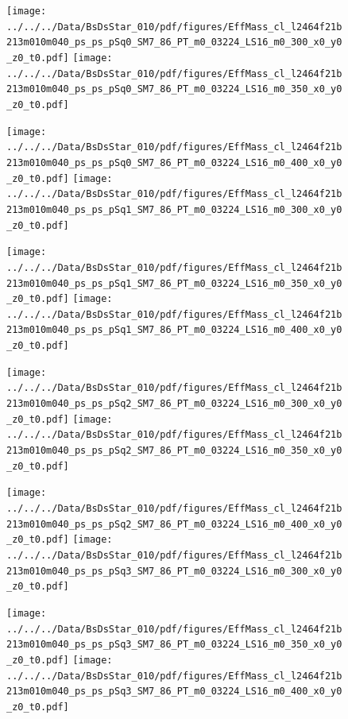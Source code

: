 \documentclass[a4paper,10pt]{article}
\begin{document}
\begin{figure}[p]
 \texttt{[image: ../../../Data/BsDsStar\_010/pdf/figures/EffMass\_cl\_l2464f21b213m010m040\_ps\_ps\_pSq0\_SM7\_86\_PT\_m0\_03224\_LS16\_m0\_300\_x0\_y0\_z0\_t0.pdf]} 
 \texttt{[image: ../../../Data/BsDsStar\_010/pdf/figures/EffMass\_cl\_l2464f21b213m010m040\_ps\_ps\_pSq0\_SM7\_86\_PT\_m0\_03224\_LS16\_m0\_350\_x0\_y0\_z0\_t0.pdf]} 
 \end{figure}
\begin{figure}[p]
 \texttt{[image: ../../../Data/BsDsStar\_010/pdf/figures/EffMass\_cl\_l2464f21b213m010m040\_ps\_ps\_pSq0\_SM7\_86\_PT\_m0\_03224\_LS16\_m0\_400\_x0\_y0\_z0\_t0.pdf]} 
 \texttt{[image: ../../../Data/BsDsStar\_010/pdf/figures/EffMass\_cl\_l2464f21b213m010m040\_ps\_ps\_pSq1\_SM7\_86\_PT\_m0\_03224\_LS16\_m0\_300\_x0\_y0\_z0\_t0.pdf]} 
 \end{figure}
\begin{figure}[p]
 \texttt{[image: ../../../Data/BsDsStar\_010/pdf/figures/EffMass\_cl\_l2464f21b213m010m040\_ps\_ps\_pSq1\_SM7\_86\_PT\_m0\_03224\_LS16\_m0\_350\_x0\_y0\_z0\_t0.pdf]} 
 \texttt{[image: ../../../Data/BsDsStar\_010/pdf/figures/EffMass\_cl\_l2464f21b213m010m040\_ps\_ps\_pSq1\_SM7\_86\_PT\_m0\_03224\_LS16\_m0\_400\_x0\_y0\_z0\_t0.pdf]} 
 \end{figure}
\clearpage
\begin{figure}[p]
 \texttt{[image: ../../../Data/BsDsStar\_010/pdf/figures/EffMass\_cl\_l2464f21b213m010m040\_ps\_ps\_pSq2\_SM7\_86\_PT\_m0\_03224\_LS16\_m0\_300\_x0\_y0\_z0\_t0.pdf]} 
 \texttt{[image: ../../../Data/BsDsStar\_010/pdf/figures/EffMass\_cl\_l2464f21b213m010m040\_ps\_ps\_pSq2\_SM7\_86\_PT\_m0\_03224\_LS16\_m0\_350\_x0\_y0\_z0\_t0.pdf]} 
 \end{figure}
\begin{figure}[p]
 \texttt{[image: ../../../Data/BsDsStar\_010/pdf/figures/EffMass\_cl\_l2464f21b213m010m040\_ps\_ps\_pSq2\_SM7\_86\_PT\_m0\_03224\_LS16\_m0\_400\_x0\_y0\_z0\_t0.pdf]} 
 \texttt{[image: ../../../Data/BsDsStar\_010/pdf/figures/EffMass\_cl\_l2464f21b213m010m040\_ps\_ps\_pSq3\_SM7\_86\_PT\_m0\_03224\_LS16\_m0\_300\_x0\_y0\_z0\_t0.pdf]} 
 \end{figure}
\begin{figure}[p]
 \texttt{[image: ../../../Data/BsDsStar\_010/pdf/figures/EffMass\_cl\_l2464f21b213m010m040\_ps\_ps\_pSq3\_SM7\_86\_PT\_m0\_03224\_LS16\_m0\_350\_x0\_y0\_z0\_t0.pdf]} 
 \texttt{[image: ../../../Data/BsDsStar\_010/pdf/figures/EffMass\_cl\_l2464f21b213m010m040\_ps\_ps\_pSq3\_SM7\_86\_PT\_m0\_03224\_LS16\_m0\_400\_x0\_y0\_z0\_t0.pdf]} 
 \end{figure}
\end{document}
